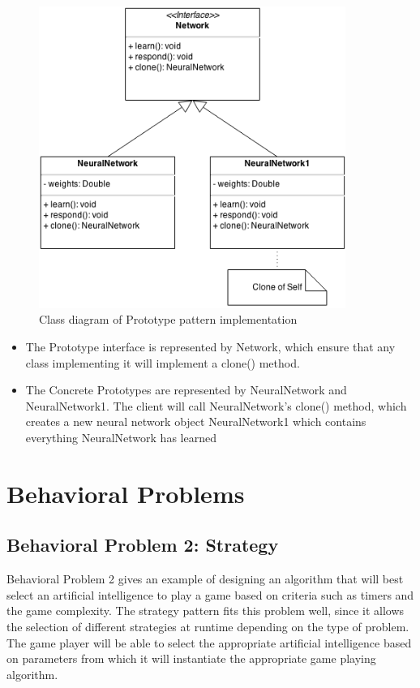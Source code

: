 \documentclass[12pt]{article}
\begin{document}
\begin{figure}[!htb]
  \begin{center}
    \includegraphics[width=100mm]{Prototype.png}
    \caption{Class diagram of Prototype pattern implementation}
    \label{fig:prototype}
  \end{center} 
\end{figure}

\begin{itemize}
\item The Prototype interface is represented by {\ttfamily Network}, which 
  ensure that any class implementing it will implement a {\ttfamily clone()} 
  method.
\item The Concrete Prototypes are represented by {\ttfamily NeuralNetwork} and
  {\ttfamily NeuralNetwork1}. The client will call {\ttfamily NeuralNetwork}'s 
  {\ttfamily clone()} method, which creates a new neural network object
  {\ttfamily NeuralNetwork1} which contains everything {\ttfamily NeuralNetwork}
  has learned
\end{itemize}


\newpage
\section{Behavioral Problems}
\subsection{Behavioral Problem 2: Strategy}

Behavioral Problem 2 gives an example of designing an algorithm that will best
select an artificial intelligence to play a game based on criteria such as 
timers and the game complexity. The strategy pattern fits this problem well, 
since it allows the selection of different strategies at runtime depending on 
the type of problem. The game player will be able to select the appropriate 
artificial intelligence based on parameters from which it will instantiate the
appropriate game playing algorithm.
\end{document}
